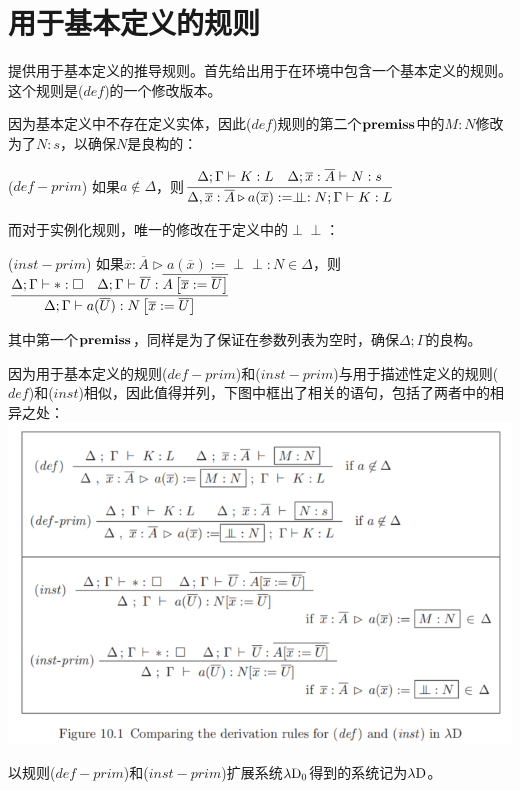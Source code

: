 \documentclass[UTF8]{article}
\newcommand{\dperp}{\perp\!\!\!\perp}
\begin{document}
	\section{用于基本定义的规则}
	\noindent
	提供用于基本定义的推导规则。首先给出用于在环境中包含一个基本定义的规则。这个规则是($def$)的一个修改版本。
	
		因为基本定义中不存在定义实体，因此($def$)规则的第二个$\bf premiss$中的$M:N$修改为了$N:s$，以确保$N$是良构的：
		
		($def-prim$) 如果$a\notin\Delta$，则$\cfrac{\Delta;\Gamma\vdash K:L\ \ \ \Delta;\overline{x}:\overline{A}\vdash N:s}  {\Delta,\overline{x}:\overline{A}\triangleright a(\overline{x}):=\dperp:N;\Gamma\vdash K:L}$
		
		而对于实例化规则，唯一的修改在于定义中的$\dperp$：
		
		($inst-prim$) 如果$\overline{x}:\overline{A}\triangleright a(\overline{x}):=\dperp:N\in\Delta$，则$\cfrac{\Delta;\Gamma\vdash*:\square\ \ \ \Delta;\Gamma\vdash\overline{U}:\overline{A\left[\overline{x}:=\overline{U}\right]}}   {\Delta;\Gamma\vdash a(\overline{U}):N\left[\overline{x}:=\overline{U}\right]}$
		
		其中第一个$\bf premiss$，同样是为了保证在参数列表为空时，确保$\Delta;\Gamma$的良构。
		
		因为用于基本定义的规则($def-prim$)和($inst-prim$)与用于描述性定义的规则($def$)和($inst$)相似，因此值得并列，下图中框出了相关的语句，包括了两者中的相异之处：\\
		\includegraphics[width=0.93\linewidth]{"../imgs/10-2.png"}
		
		以规则($def-prim$)和($inst-prim$)扩展系统$\lambda{\rm D_0}$得到的系统记为$\lambda{\rm D}$。
\end{document}
